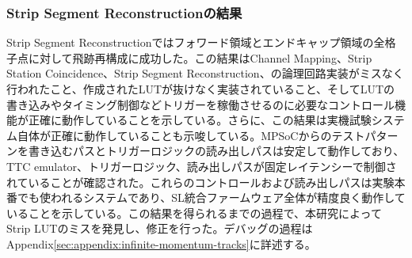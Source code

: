 \subsubsection*{Strip Segment Reconstructionの結果}
Strip Segment Reconstructionではフォワード領域とエンドキャップ領域の全格子点に対して飛跡再構成に成功した。この結果はChannel Mapping、Strip Station Coincidence、Strip Segment Reconstruction、の論理回路実装がミスなく行われたこと、作成されたLUTが抜けなく実装されていること、そしてLUTの書き込みやタイミング制御などトリガーを稼働させるのに必要なコントロール機能が正確に動作していることを示している。さらに、この結果は実機試験システム自体が正確に動作していることも示唆している。MPSoCからのテストパターンを書き込むパスとトリガーロジックの読み出しパスは安定して動作しており、TTC emulator、トリガーロジック、読み出しパスが固定レイテンシーで制御されていることが確認された。これらのコントロールおよび読み出しパスは実験本番でも使われるシステムであり、SL統合ファームウェア全体が精度良く動作していることを示している。この結果を得られるまでの過程で、本研究によって
Strip LUTのミスを発見し、修正を行った。デバッグの過程はAppendix\ref{sec:appendix:infinite-momentum-tracks}に詳述する。

